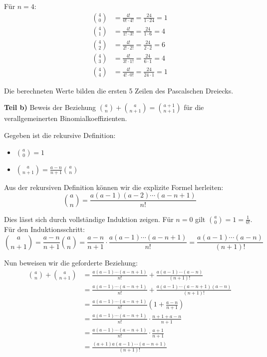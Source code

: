 \documentclass{article}
\begin{document}
Für $n = 4$:
\begin{align}
\binom{4}{0} &= \frac{4!}{0! \cdot 4!} = \frac{24}{1 \cdot 24} = 1 \\
\binom{4}{1} &= \frac{4!}{1! \cdot 3!} = \frac{24}{1 \cdot 6} = 4 \\
\binom{4}{2} &= \frac{4!}{2! \cdot 2!} = \frac{24}{2 \cdot 2} = 6 \\
\binom{4}{3} &= \frac{4!}{3! \cdot 1!} = \frac{24}{6 \cdot 1} = 4 \\
\binom{4}{4} &= \frac{4!}{4! \cdot 0!} = \frac{24}{24 \cdot 1} = 1
\end{align}

Die berechneten Werte bilden die ersten 5 Zeilen des Pascalschen Dreiecks.

\textbf{Teil b)} Beweis der Beziehung $\binom{a}{n} + \binom{a}{n + 1} = \binom{a + 1}{n + 1}$ für die verallgemeinerten Binomialkoeffizienten.

Gegeben ist die rekursive Definition:
\begin{itemize}
\item $\binom{a}{0} = 1$
\item $\binom{a}{n + 1} = \frac{a - n}{n + 1} \binom{a}{n}$
\end{itemize}

Aus der rekursiven Definition können wir die explizite Formel herleiten:
$$\binom{a}{n} = \frac{a(a-1)(a-2)\cdots(a-n+1)}{n!}$$

Dies lässt sich durch vollständige Induktion zeigen. Für $n = 0$ gilt $\binom{a}{0} = 1 = \frac{1}{0!}$. Für den Induktionsschritt:
$$\binom{a}{n+1} = \frac{a-n}{n+1} \binom{a}{n} = \frac{a-n}{n+1} \cdot \frac{a(a-1)\cdots(a-n+1)}{n!} = \frac{a(a-1)\cdots(a-n)}{(n+1)!}$$

Nun beweisen wir die geforderte Beziehung:
\begin{align}
\binom{a}{n} + \binom{a}{n+1} &= \frac{a(a-1)\cdots(a-n+1)}{n!} + \frac{a(a-1)\cdots(a-n)}{(n+1)!} \\
&= \frac{a(a-1)\cdots(a-n+1)}{n!} + \frac{a(a-1)\cdots(a-n+1)(a-n)}{(n+1)!} \\
&= \frac{a(a-1)\cdots(a-n+1)}{n!} \left(1 + \frac{a-n}{n+1}\right) \\
&= \frac{a(a-1)\cdots(a-n+1)}{n!} \cdot \frac{n+1+a-n}{n+1} \\
&= \frac{a(a-1)\cdots(a-n+1)}{n!} \cdot \frac{a+1}{n+1} \\
&= \frac{(a+1)a(a-1)\cdots(a-n+1)}{(n+1)!}
\end{align}
\end{document}
